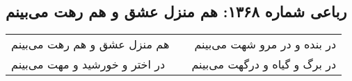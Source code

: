 \begin{center}
\section*{رباعی شماره ۱۳۶۸: هم منزل عشق و هم رهت می‌بینم}
\label{sec:1368}
\begin{longtable}{l p{0.5cm} r}
هم منزل عشق و هم رهت می‌بینم
&&
در بنده و در مرو شهت می‌بینم
\\
در اختر و خورشید و مهت می‌بینم
&&
در برگ و گیاه و درگهت می‌بینم
\\
\end{longtable}
\end{center}
